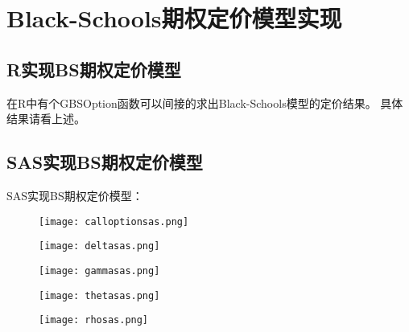 
\section{Black-Schools期权定价模型实现}

\subsection{R实现BS期权定价模型}
	在R中有个GBSOption函数可以间接的求出Black-Schools模型的定价结果。
	具体结果请看上述。
	
\subsection{SAS实现BS期权定价模型}
	SAS实现BS期权定价模型：
	
	\begin{figure}[htb] %
		\centering
		\texttt{[image: calloptionsas.png]}
		\label{fig:xfig1}
	\end{figure}


	
	\begin{figure}[htb] %
		\centering
		\texttt{[image: deltasas.png]}
		\label{fig:xfig1}
	\end{figure}
	
	
	\begin{figure}[htb] %
		\centering
		\texttt{[image: gammasas.png]}
		\label{fig:xfig1}
	\end{figure}
	
		
	
	\begin{figure}[htb] %
		\centering
		\texttt{[image: thetasas.png]}
		\label{fig:xfig1}
	\end{figure}
	
	
	
	
	
	\begin{figure}[htb] %
		\centering
		\texttt{[image: rhosas.png]}
		\label{fig:xfig1}
	\end{figure}
	
